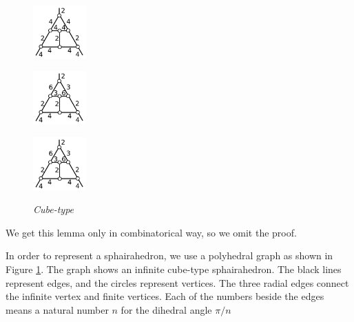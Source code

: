 \documentclass[dvipdfmx]{interact}
\theoremstyle{plain}%
\theoremstyle{definition}
\theoremstyle{remark}
\theoremstyle{problemstyle}
\begin{document}
\begin{figure}[h!tbp]
\begin{minipage}[t]{0.75\textwidth}
\begin{minipage}[t]{0.15\textwidth}
   \subcaption{}
   \label{}
  \end{minipage}
 \hspace*{\fill}
  \begin{minipage}[t]{0.15\textwidth}
   \centering
   \includegraphics[width=0.8in, keepaspectratio]{./img/HexahedraWithSphericalFaces/cube/cube_i.png}
   \subcaption{}
   \label{fig:}
  \end{minipage}
 \hspace*{\fill}
  \begin{minipage}[t]{0.15\textwidth}
   \centering
   \includegraphics[width=0.8in, keepaspectratio]{./img/HexahedraWithSphericalFaces/cube/cube_j.png}
   \subcaption{}
   \label{fig:}
  \end{minipage}
 \hspace*{\fill}
  \begin{minipage}[t]{0.15\textwidth}
   \centering
   \includegraphics[width=0.8in, keepaspectratio]{./img/HexahedraWithSphericalFaces/cube/cube_k.png}
   \subcaption{} %
   \label{fig:}
  \end{minipage}
 \hspace*{\fill}
  \caption{\textit{Cube-type}}
  \label{fig:cubeGraph}
 \end{minipage}
\end{figure}

We get this lemma only in combinatorical way, so we omit the proof.

In order to represent a sphairahedron, we use a polyhedral graph as
shown in Figure \ref{fig:cubeGraph}. The graph shows an infinite cube-type sphairahedron.
The black lines represent edges, and the circles represent
vertices. The three radial edges connect the infinite vertex and finite
vertices. Each of the numbers beside 
the edges means a natural number $n$ for the dihedral angle $\pi / n$
\end{document}
